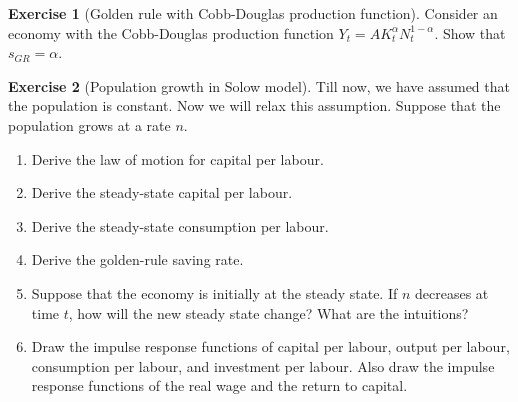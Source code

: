 \documentclass{book}
\theoremstyle{definition}
\newtheorem{exercise}{Exercise}[chapter]
\theoremstyle{plain}
\begin{document}
\begin{exercise}[Golden rule with Cobb-Douglas production function]
    Consider an economy with the Cobb-Douglas production function $Y_t = A K_t^{\alpha} N_t^{1-\alpha}$. Show that $s_{GR} = \alpha$.
\end{exercise}

\begin{exercise}[Population growth in Solow model]
    Till now, we have assumed that the population is constant. Now we will relax this assumption. Suppose that the population grows at a rate $n$.
    \begin{enumerate}[label=(\arabic*)]
        \item Derive the law of motion for capital per labour.
        \item Derive the steady-state capital per labour.
        \item Derive the steady-state consumption per labour.
        \item Derive the golden-rule saving rate.
        \item Suppose that the economy is initially at the steady state. If $n$ decreases at time $t$, how will the new steady state change? What are the intuitions?
        \item Draw the impulse response functions of capital per labour, output per labour, consumption per labour, and investment per labour. Also draw the impulse response functions of the real wage and the return to capital.
    \end{enumerate}
\end{exercise}
\end{document}
